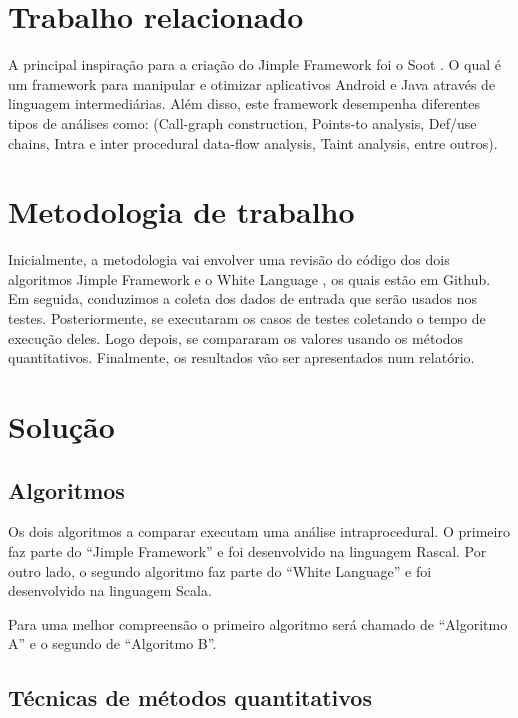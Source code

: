 \documentclass[12pt]{article}
\begin{document}
\section{Trabalho relacionado}

A principal inspiração para a criação do Jimple Framework foi o Soot \cite{soot_web}. O qual é um framework para manipular e otimizar aplicativos Android e Java através de linguagem intermediárias. Além disso, este framework desempenha diferentes tipos de análises como: (Call-graph construction, Points-to analysis, Def/use chains,  Intra e inter procedural data-flow analysis, Taint analysis, entre outros).


\section{Metodologia de trabalho}

Inicialmente, a metodologia vai envolver uma revisão do código dos dois algoritmos Jimple Framework \cite{jimple_web} e o White Language \cite{while_lang_web}, os quais estão em Github. Em seguida, conduzimos a coleta dos dados de entrada que serão usados nos testes. Posteriormente, se executaram os casos de testes coletando o tempo de execução deles. Logo depois, se compararam os valores usando os métodos quantitativos. Finalmente, os resultados vão ser apresentados num relatório.

\section{Solução}


\subsection{Algoritmos}

Os dois algoritmos a comparar executam uma análise intraprocedural. O primeiro faz parte do ``Jimple Framework'' \cite{jimple_web} e foi desenvolvido na linguagem Rascal. Por outro lado, o segundo algoritmo faz parte do ``White Language'' \cite{while_lang_web} e foi desenvolvido na linguagem Scala. 

Para uma melhor compreensão o primeiro algoritmo será chamado de ``Algoritmo A'' e o segundo de ``Algoritmo B''.


\subsection{Técnicas de métodos quantitativos}
\end{document}
